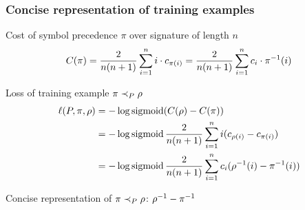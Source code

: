 \documentclass[a4paper]{beamer}
\begin{document}
\begin{frame}
\frametitle{Concise representation of training examples}
\begin{block}{Cost of symbol precedence $\pi$ over signature of length $n$}
\begin{equation*}
C(\pi)
= \frac{2}{n(n+1)} \sum_{i=1}^n i \cdot c_{\pi(i)}
= \frac{2}{n(n+1)} \sum_{i=1}^n c_i \cdot \pi^{-1}(i)
\end{equation*}
\end{block}

\begin{block}{Loss of training example $\pi \prec_{P} \rho$}
\begin{align*}
\ell(P, \pi, \rho)
&= - \log \operatorname{sigmoid} (C(\rho) - C(\pi)) \\
&= - \log \operatorname{sigmoid} \frac{2}{n(n+1)} \sum_{i=1}^n i (c_{\rho(i)} - c_{\pi(i)}) \\
&= - \log \operatorname{sigmoid} \frac{2}{n(n+1)} \sum_{i=1}^n c_i (\rho^{-1}(i) - \pi^{-1}(i))
\end{align*}
\end{block}

Concise representation of $\pi \prec_{P} \rho$:
$\rho^{-1} - \pi^{-1}$
\end{frame}
\end{document}

